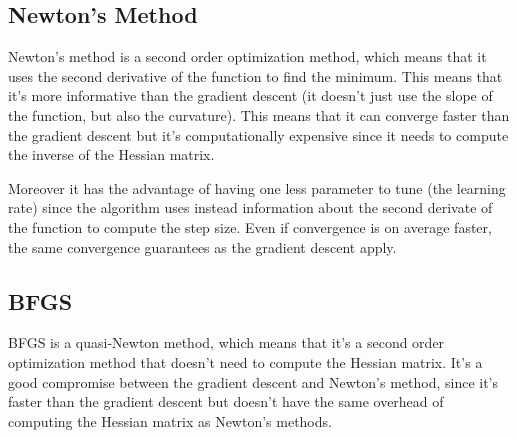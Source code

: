 \subsection{Newton's Method}
\label{sec:newtons-method}
Newton's method is a second order optimization method, which means that it uses the second derivative of the function to find the minimum. This means that it's more informative than the gradient descent (it doesn't just use the slope of the function, but also the curvature). This means that it can converge faster than the gradient descent but it's computationally expensive since it needs to compute the inverse of the Hessian matrix.

Moreover it has the advantage of having one less parameter to tune (the learning rate) since the algorithm uses instead information about the second derivate of the function to compute the step size.
Even if convergence is on average faster, the same convergence guarantees as the gradient descent apply.


\subsection{BFGS}
\label{sec:bfgs}
BFGS is a quasi-Newton method, which means that it's a second order optimization method that doesn't need to compute the Hessian matrix. It's a good compromise between the gradient descent and Newton's method, since it's faster than the gradient descent but doesn't have the same overhead of computing the Hessian matrix as Newton's methods.

